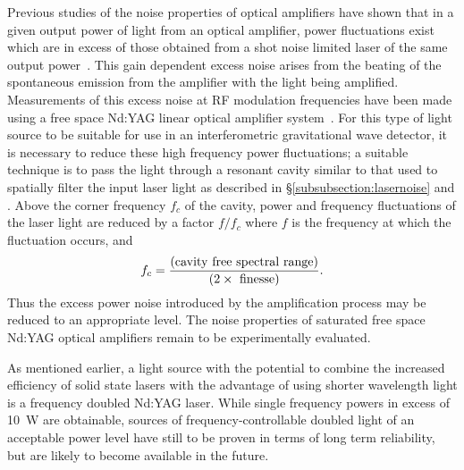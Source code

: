 \documentclass{article}
\begin{document}
Previous studies of the noise properties of optical amplifiers have shown that
in a given output power of light from an optical amplifier, power fluctuations
exist which are in excess of those obtained from a shot noise limited laser of
the same output power~\cite{Harris}. This gain dependent excess noise arises
from the beating of the spontaneous emission from the amplifier with the light
being amplified. Measurements of this excess noise at RF modulation frequencies
have been made using a free space Nd:YAG linear optical amplifier
system~\cite{Tulloch}. For this type of light source to be suitable for use in
an interferometric gravitational wave detector, it is necessary to reduce these
high frequency power fluctuations; a suitable technique is to pass the light
through a resonant cavity similar to that used to spatially filter the input
laser light as described in \S\ref{subsubsection:lasernoise} and \cite{Willke}.
Above the corner frequency $f_{c}$ of the cavity, power and frequency
fluctuations of the laser light are reduced by a factor $f/ f_{c}$ where $f$ is
the frequency at which the fluctuation occurs, and
%
\begin{equation}
  f_c = \frac{({\rm cavity\ free\ spectral\ range})}{(2 \times {\rm
  \ finesse})}.
  \label{equation:filtering}
\end{equation}
%
Thus the excess power noise introduced by the amplification process may be
reduced to an appropriate level. The noise properties of saturated free space
Nd:YAG optical amplifiers remain to be experimentally evaluated.

As mentioned earlier, a light source with the potential to combine the increased
efficiency of solid state lasers with the advantage of using shorter wavelength
light is a frequency doubled Nd:YAG laser. While single frequency powers in
excess of 10~W are obtainable, sources of frequency-controllable doubled light
of an acceptable power level have still to be proven in terms of long term
reliability, but are likely to become available in the future.
\end{document}
